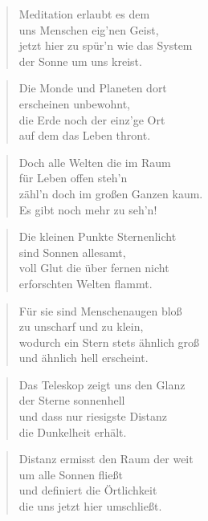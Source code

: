 \documentclass[10pt,a4paper]{article}
\begin{document}
\begin{paracol}{2}
\begin{verse}
Meditation erlaubt es dem \\
uns Menschen eig’nen Geist, \\
jetzt hier zu spür’n wie das System \\
der Sonne um uns kreist. \\
\end{verse}

\begin{verse}
Die Monde und Planeten dort \\
erscheinen unbewohnt, \\
die Erde noch der einz’ge Ort \\
auf dem das Leben thront. \\
\end{verse}

\begin{verse}
Doch alle Welten die im Raum \\
für Leben offen steh’n \\
zähl’n doch im großen Ganzen kaum. \\
Es gibt noch mehr zu seh’n! \\
\end{verse}

\begin{verse}
Die kleinen Punkte Sternenlicht \\
sind Sonnen allesamt, \\
voll Glut die über fernen nicht \\
erforschten Welten flammt. \\
\end{verse}

\begin{verse}
Für sie sind Menschenaugen bloß \\
zu unscharf und zu klein, \\
wodurch ein Stern stets ähnlich groß \\
und ähnlich hell erscheint. \\
\end{verse}

\begin{verse}
Das Teleskop zeigt uns den Glanz \\
der Sterne sonnenhell \\
und dass nur riesigste Distanz \\
die Dunkelheit erhält. \\
\end{verse}

\begin{verse}
Distanz ermisst den Raum der weit \\
um alle Sonnen fließt \\
und definiert die Örtlichkeit \\
die uns jetzt hier umschließt. \\
\end{verse}


\end{paracol}
\end{document}
